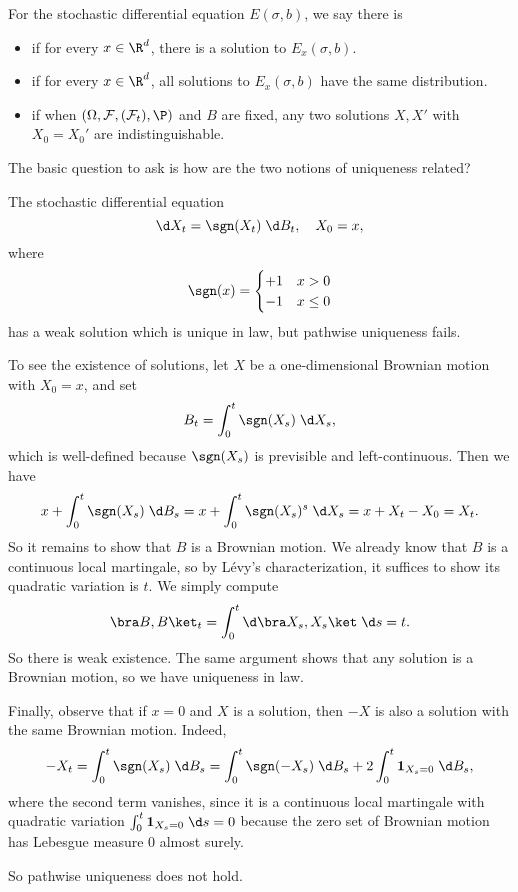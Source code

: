 \documentclass[a4paper]{article}
\begin{document}
\begin{defi}
  For the stochastic differential equation $E(\sigma, b)$, we say there is
  \begin{itemize}
    \item {} if for every $x \in \R^d$, there is a solution to $E_x(\sigma, b)$.
    \item {} if for every $x \in \R^d$, all solutions to $E_x(\sigma, b)$ have the same distribution.
    \item {} if when $(\Omega, \mathcal{F}, (\mathcal{F}_t), \P)$ and $B$ are fixed, any two solutions $X, X'$ with $X_0 = X_0'$ are indistinguishable.
  \end{itemize}
\end{defi}
The basic question to ask is how are the two notions of uniqueness related?
\begin{eg}[Tanaka]
  The stochastic differential equation
  \[
    \d X_t = \sgn(X_t) \;\d B_t,\quad X_0 = x,
  \]
  where
  \[
    \sgn(x) =
    \begin{cases}
      +1 & x > 0\\
      -1 & x \leq 0
    \end{cases}
  \]
  has a weak solution which is unique in law, but pathwise uniqueness fails.

  To see the existence of solutions, let $X$ be a one-dimensional Brownian motion with $X_0 = x$, and set
  \[
    B_t = \int_0^t \sgn(X_s) \;\d X_s,
  \]
  which is well-defined because $\sgn(X_s)$ is previsible and left-continuous. Then we have
  \[
    x + \int_0^t \sgn(X_s)\;\d B_s = x + \int_0^t \sgn(X_s)^s \;\d X_s = x + X_t - X_0 = X_t.
  \]
  So it remains to show that $B$ is a Brownian motion. We already know that $B$ is a continuous local martingale, so by L\'evy's characterization, it suffices to show its quadratic variation is $t$. We simply compute
  \[
    \bra B, B\ket_t = \int_0^t \d \bra X_s, X_s\ket \;\d s = t.
  \]
  So there is weak existence. The same argument shows that any solution is a Brownian motion, so we have uniqueness in law.

  Finally, observe that if $x = 0$ and $X$ is a solution, then $-X$ is also a solution with the same Brownian motion. Indeed,
  \[
    -X_t = \int_0^t \sgn(X_s) \;\d B_s = \int_0^t \sgn(-X_s)\;\d B_s + 2 \int_0^t \mathbf{1}_{X_s = 0} \;\d B_s,
  \]
  where the second term vanishes, since it is a continuous local martingale with quadratic variation $\int_0^t \mathbf{1}_{X_s = 0} \;\d s = 0$ because the zero set of Brownian motion has Lebesgue measure $0$ almost surely.

  So pathwise uniqueness does not hold.
\end{eg}
\end{document}
